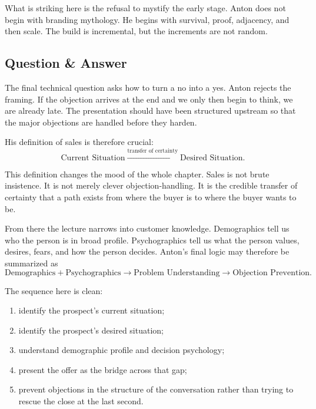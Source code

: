 What is striking here is the refusal to mystify the early stage. Anton does not begin with branding mythology. He begins with survival, proof, adjacency, and then scale. The build is incremental, but the increments are not random.

\subsection{Question \& Answer}

The final technical question asks how to turn a no into a yes. Anton rejects the framing. If the objection arrives at the end and we only then begin to think, we are already late. The presentation should have been structured upstream so that the major objections are handled before they harden.

His definition of sales is therefore crucial:
\begin{equation}
\text{Current Situation} \xrightarrow{\text{transfer of certainty}} \text{Desired Situation}.
\end{equation}

This definition changes the mood of the whole chapter. Sales is not brute insistence. It is not merely clever objection-handling. It is the credible transfer of certainty that a path exists from where the buyer is to where the buyer wants to be.

From there the lecture narrows into customer knowledge. Demographics tell us who the person is in broad profile. Psychographics tell us what the person values, desires, fears, and how the person decides. Anton's final logic may therefore be summarized as
\begin{equation}
\text{Demographics} + \text{Psychographics} \to \text{Problem Understanding} \to \text{Objection Prevention}.
\end{equation}

The sequence here is clean:
\begin{enumerate}
\item identify the prospect's current situation;
\item identify the prospect's desired situation;
\item understand demographic profile and decision psychology;
\item present the offer as the bridge across that gap;
\item prevent objections in the structure of the conversation rather than trying to rescue the close at the last second.
\end{enumerate}


